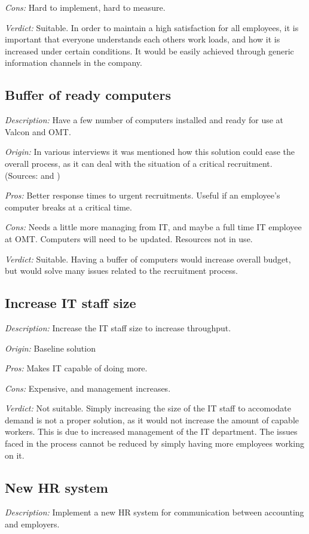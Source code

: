 \noindent \emph{Cons:} Hard to implement, hard to measure.

\emph{Verdict:}
Suitable. In order to maintain a high satisfaction for all employees, it is important that everyone understands each others work loads, and how it is increased under certain conditions. It would be easily achieved through generic information channels in the company.

\subsection{Buffer of ready computers}
\emph{Description:} Have a few number of computers installed and ready for use at Valcon and OMT.

\emph{Origin:}
In various interviews it was mentioned how this solution could ease the overall process, as it can deal with the situation of a critical recruitment.
(Sources:  and )

\noindent \emph{Pros:} Better response times to urgent recruitments. Useful if an employee's computer breaks at a critical time.

\noindent \emph{Cons:} Needs a little more managing from IT, and maybe a full time IT employee at OMT. Computers will need to be updated. Resources not in use.

\emph{Verdict:}
Suitable. Having a buffer of computers would increase overall budget, but would solve many issues related to the recruitment process.

\subsection{Increase IT staff size}
\emph{Description:} Increase the IT staff size to increase throughput.

\emph{Origin:}
Baseline solution

\noindent \emph{Pros:} Makes IT capable of doing more.

\noindent \emph{Cons:} Expensive, and management increases.

\emph{Verdict:}
Not suitable. Simply increasing the size of the IT staff to accomodate demand is not a proper solution, as it would not increase the amount of capable workers. This is due to increased management of the IT department. The issues faced in the process cannot be reduced by simply having more employees working on it.

\subsection{New HR system}
\emph{Description:} Implement a new HR system for communication between accounting and employers.

